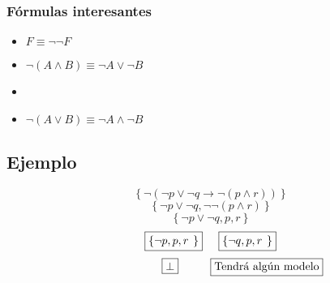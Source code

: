 \subsubsection{Fórmulas interesantes}
\begin{itemize}
        \item \(F \equiv \neg \neg F\)
        \item \(\neg(A \land B) \equiv \neg A \lor \neg B\)
        \item \item \(\neg(A \lor B) \equiv \neg A \land \neg B\)
\end{itemize}
\subsection{Ejemplo}
\[\boxed{\left \{ \neg(\neg p \lor \neg q \rightarrow \neg(p\land r)) \right.\left.  \right \}}\]
\[\boxed{\left \{ \neg p \lor \neg q, \neg \neg (p\land r) \right.\left.  \right \}}\]
\[\boxed{\left \{ \neg p \lor \neg q, p, r \right.\left.  \right \}}\]
\[\boxed{\left \{ \neg p, p, r \right.\left.  \right \}} \hspace{5mm} \boxed{\left \{ \neg q, p, r \right.\left.  \right \}}\]
\[\hspace{20mm}\boxed{\perp } \hspace{10mm} \boxed{\text{Tendrá algún modelo}}\]
